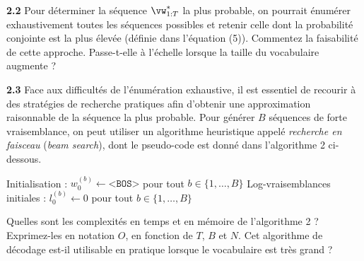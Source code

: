 \documentclass[12pt]{article}
\theoremstyle{definition}
\newcommand{\bos}{\texttt{<BOS>}}
\begin{document}
\textbf{2.2} Pour déterminer la séquence $\vw_{1:T}^*$ la plus probable, on pourrait énumérer exhaustivement toutes les séquences possibles et retenir celle dont la probabilité conjointe est la plus élevée (définie dans l'équation (5)). Commentez la faisabilité de cette approche. Passe-t-elle à l'échelle lorsque la taille du vocabulaire augmente ?

\textbf{2.3} Face aux difficultés de l'énumération exhaustive, il est essentiel de recourir à des stratégies de recherche pratiques afin d'obtenir une approximation raisonnable de la séquence la plus probable. Pour générer $B$ séquences de forte vraisemblance, on peut utiliser un algorithme heuristique appelé \textit{recherche en faisceau} (\textit{beam search}), dont le pseudo-code est donné dans l'algorithme 2 ci-dessous.

\begin{minipage}{\linewidth}
    \begin{algorithm}[H]
    \DontPrintSemicolon
    Initialisation : $w_{0}^{(b)} \leftarrow \bos$ pour tout $b \in \{1,\ldots,B\}$\;
    Log-vraisemblances initiales : $l_{0}^{(b)} \leftarrow 0$ pour tout $b \in \{1,\ldots,B\}$\;
    \caption{Décodage par \textit{Beam search}}
    \label{alg:beam-search-decoding}
    \end{algorithm}
\end{minipage}

    

Quelles sont les complexités en temps et en mémoire de l'algorithme 2 ? Exprimez-les en notation $O$, en fonction de $T$, $B$ et $N$. Cet algorithme de décodage est-il utilisable en pratique lorsque le vocabulaire est très grand ?
\end{document}
